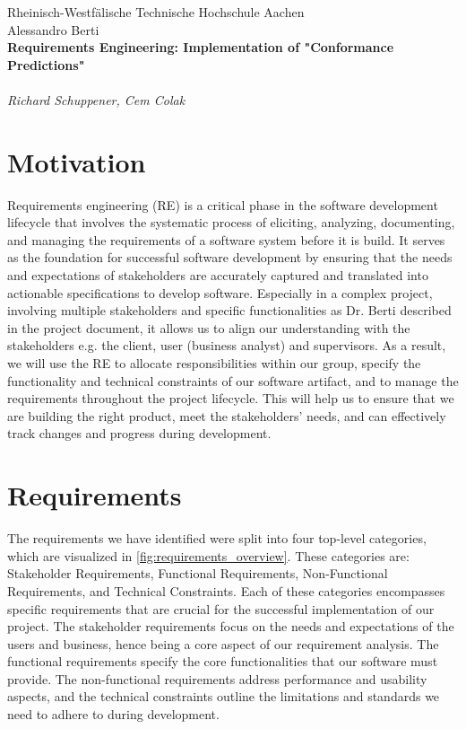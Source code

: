 \documentclass[12pt,a4paper]{article}
\begin{document}
\thispagestyle{empty}
\begin{center}
Rheinisch-Westf\"alische Technische Hochschule Aachen \\
Alessandro Berti\\[6ex]

\LARGE
	\textbf{Requirements Engineering: Implementation of "Conformance Predictions"} \\[6ex]
        \\
	\textit{Richard Schuppener, Cem Colak} \\[6ex]
\end{center}

\newpage

\tableofcontents
\newpage

\section{Motivation}
Requirements engineering (RE) is a critical phase in the software development lifecycle that involves the systematic process of eliciting, analyzing, documenting, and managing the requirements of a software system before it is build. It serves as the foundation for successful software development by ensuring that the needs and expectations of stakeholders are accurately captured and translated into actionable specifications to develop software. Especially in a complex project, involving multiple stakeholders and specific functionalities as Dr. Berti described in the project document, it allows us to align our understanding with the stakeholders e.g. the client, user (business analyst) and supervisors. As a result, we will use the RE to allocate responsibilities within our group, specify the functionality and technical constraints of our software artifact, and to manage the requirements throughout the project lifecycle. This will help us to ensure that we are building the right product, meet the stakeholders' needs, and can effectively track changes and progress during development.
\section{Requirements}
The requirements we have identified were split into four top-level categories, which are visualized in \ref{fig:requirements_overview}. These categories are: Stakeholder Requirements, Functional Requirements, Non-Functional Requirements, and Technical Constraints. Each of these categories encompasses specific requirements that are crucial for the successful implementation of our project. The stakeholder requirements focus on the needs and expectations of the users and business, hence being a core aspect of our requirement analysis. The functional requirements specify the core functionalities that our software must provide. The non-functional requirements address performance and usability aspects, and the technical constraints outline the limitations and standards we need to adhere to during development.
\end{document}
